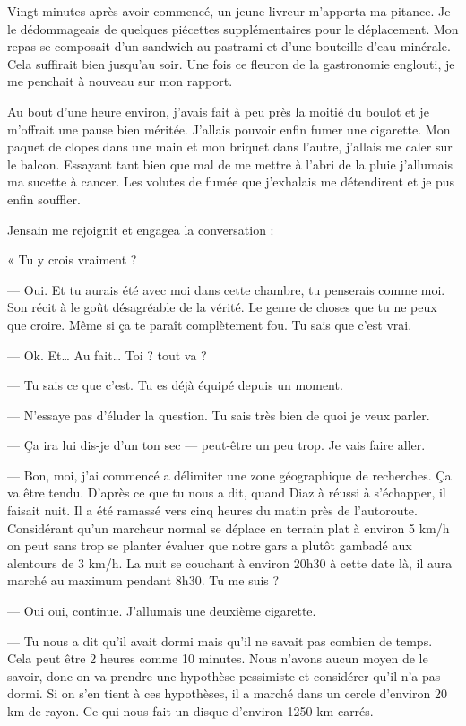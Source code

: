Vingt minutes après avoir commencé, un jeune livreur m'apporta ma pitance. Je le dédommageais de quelques piécettes 
supplémentaires pour le déplacement. Mon repas se composait d'un sandwich au pastrami et d'une bouteille d'eau 
minérale. Cela suffirait bien jusqu'au soir. Une fois ce fleuron de la gastronomie englouti, je me penchait à 
nouveau sur mon rapport.

Au bout d'une heure environ, j'avais fait à peu près la moitié du boulot et je m'offrait une pause bien méritée. 
J'allais pouvoir enfin fumer une cigarette. Mon paquet de clopes dans une main et mon briquet dans l'autre, j'allais me 
caler sur le balcon. Essayant tant bien que mal de me mettre à l'abri de la pluie j'allumais ma sucette à cancer. Les 
volutes de fumée que j'exhalais me détendirent et je pus enfin souffler. 

Jensain me rejoignit et engagea la conversation :

« Tu y crois vraiment ?

— Oui. Et tu aurais été avec moi dans cette chambre, tu penserais comme moi. Son récit à le goût désagréable de la 
vérité. Le genre de choses que tu ne peux que croire. Même si ça te paraît complètement fou. Tu sais que c'est vrai.

— Ok. Et… Au fait… Toi ? tout va ?

— Tu sais ce que c'est. Tu es déjà équipé depuis un moment.

— N'essaye pas d'éluder la question. Tu sais très bien de quoi je veux parler.

— Ça ira lui dis-je d'un ton sec — peut-être un peu trop. Je vais faire aller. 

— Bon, moi, j'ai commencé a délimiter une zone géographique de recherches. Ça va être tendu. D'après ce que tu nous a 
dit, quand Diaz à réussi à s'échapper, il faisait nuit. Il a été ramassé vers cinq heures du matin près de l'autoroute. 
Considérant qu'un marcheur normal se déplace en terrain plat à environ 5 km/h on peut sans trop se planter évaluer 
que notre gars a plutôt gambadé aux alentours de  3 km/h. La nuit se couchant à environ 20h30 à cette date là, il 
aura marché au maximum pendant 8h30. Tu me suis ?

— Oui oui, continue. J'allumais une deuxième cigarette.

— Tu nous a dit qu'il avait dormi mais qu'il ne savait pas combien de temps. Cela peut être 2 heures comme 10 minutes. 
Nous n'avons aucun moyen de le savoir, donc on va prendre une hypothèse pessimiste et considérer qu'il n'a pas dormi. 
Si on s'en tient à ces hypothèses, il a marché dans un cercle d'environ 20 km de rayon. Ce qui nous fait un disque 
d'environ 1250 km carrés.

